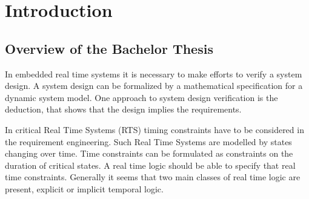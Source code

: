 






\chapter{Introduction}  %

\ifpdf
    \graphicspath{{Chapter1/Figs/Raster/}{Chapter1/Figs/PDF/}{Chapter1/Figs/}}
\else
    \graphicspath{{Chapter1/Figs/Vector/}{Chapter1/Figs/}}
\fi


\section{Overview of the Bachelor Thesis } %

In embedded real time systems it is necessary to make efforts to verify a system design.
A system design can be formalized by a mathematical specification for a dynamic system model.
One approach to system design verification is the deduction, that shows that the design implies the requirements. 

In critical Real Time Systems (RTS) timing constraints have to be considered in the requirement engineering.
Such Real Time Systems are modelled by states changing over time.
Time constraints can be formulated as constraints on the duration of critical states. 
A real time logic should be able to specify that real time constraints. Generally it seems that two main classes
of real time logic are present, explicit or implicit temporal logic.\cite{210306} 

